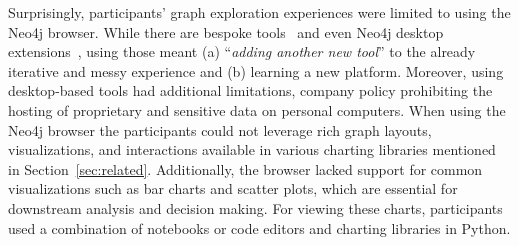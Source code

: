  Surprisingly, participants' graph exploration experiences were limited to using the Neo4j browser. While there are bespoke tools~\cite{graphistry, graphileon,linkurious} and even Neo4j desktop extensions~\cite{neobloom, neodash,yworks}, using those meant (a) ``\emph{adding another new tool}'' to the already iterative and messy experience and (b) learning a new platform. Moreover, using desktop-based tools had additional limitations, \eg company policy prohibiting the hosting of proprietary and sensitive data on personal computers. 
When using the Neo4j browser the participants could not leverage rich graph layouts, visualizations, and interactions available in various charting libraries mentioned in Section~\ref{sec:related}. Additionally, the browser lacked support for common visualizations such as bar charts and scatter plots, which are essential for downstream analysis and decision making. For viewing these charts, participants used a combination of notebooks or code editors and charting libraries in Python.


 
